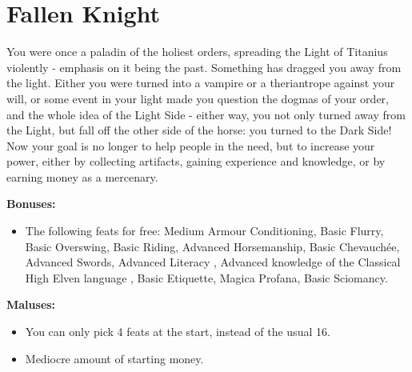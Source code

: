 \section{Fallen Knight}
You were once a paladin of the holiest orders, spreading the Light of Titanius violently - emphasis on it being the past. Something has dragged you away from the light. Either you were turned into a vampire or a theriantrope against your will, or some event in your light made you question the dogmas of your order, and the whole idea of the Light Side - either way, you not only turned away from the Light, but fall off the other side of the horse: you turned to the Dark Side! Now your goal is no longer to help people in the need, but to increase your power, either by collecting artifacts, gaining experience and knowledge, or by earning money as a mercenary.


\textbf{Bonuses:}
\begin{itemize}
	\item The following feats for free: Medium Armour Conditioning, Basic Flurry, Basic Overswing, Basic Riding, Advanced Horsemanship, Basic Chevauchée, Advanced Swords, Advanced Literacy , Advanced knowledge of the Classical High Elven language , Basic Etiquette, Magica Profana, Basic Sciomancy.
\end{itemize}
\textbf{Maluses:}
\begin{itemize}
	\item You can only pick 4 feats at the start, instead of the usual 16.
	\item Mediocre amount of starting money.
\end{itemize}
